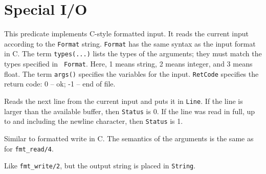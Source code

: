 \section{Special I/O}

\begin{description}
 This predicate implements C-style formatted input. It reads the current
 input according to the {\tt Format} string.  {\tt Format} has the
 same syntax as the input format in C. The term {\tt types(...)} lists the
 types of the arguments; they must match the types specified in {\tt
 Format}. Here, 1 means string, 2 means integer, and 3 means float.
 The term {\tt args()} specifies the variables for the input. {\tt RetCode}
 specifies the return code: 0 -- ok; -1 -- end of file.

 Reads the next line from the current input and puts it in {\tt Line}.
 If the line is larger than the available buffer, then {\tt Status} is 0.
 If the line was read in full, up to and including the newline character,
 then {\tt Status} is 1. 

 Similar to formatted write in C. The semantics of the arguments is the
 same as for {\tt fmt\_read/4}.

 Like {\tt fmt\_write/2}, but the output string is placed in {\tt String}.

\end{description}




